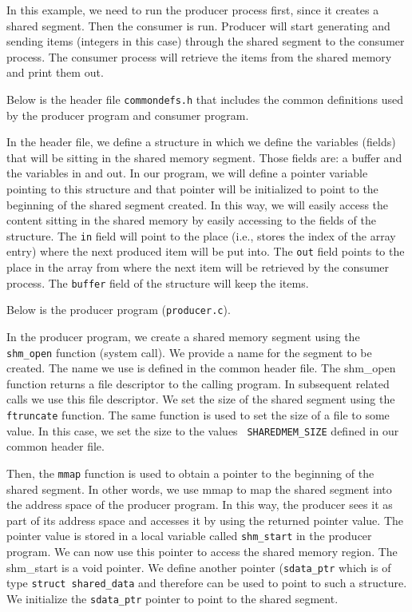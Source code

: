 In this example, we need to run the producer process first, since it
creates a shared segment. Then the consumer is run. Producer will
start generating and sending items (integers in this case) through the
shared segment to the consumer process. The consumer process will
retrieve the items from the shared memory and print them out.

Below is the header file {\tt commondefs.h} that includes the common
definitions used by the producer program and consumer program.


In the header file, we define a structure in which we define the
variables (fields) that will be sitting in the shared memory
segment. Those fields are: a buffer and the variables in and out. In
our program, we will define a pointer variable pointing to this
structure and that pointer will be initialized to point to the
beginning of the shared segment created. In this way, we will easily
access the content sitting in the shared memory by easily accessing to
the fields of the structure. The {\tt in} field will point to the
place (i.e., stores the index of the array entry) where the next
produced item will be put into. The {\tt out} field points to the
place in the array from where the next item will be retrieved by the
consumer process. The {\tt buffer} field of the structure will keep
the items.

Below is the producer program ({\tt producer.c}).


In the producer program, we create a shared memory segment using the
    {\tt shm\_open} function (system call). We provide a name for the
segment to be created. The name we use is defined in the common header
file. The shm\_open function returns a file descriptor to the calling
program. In subsequent related calls we use this file descriptor. We
set the size of the shared segment using the {\tt ftruncate}
function. The same function is used to set the size of a file to some
value. In this case, we set the size to the values {\tt
SHAREDMEM\_SIZE} defined in our common header file.

Then, the {\tt mmap} function is used to obtain a pointer to the
beginning of the shared segment. In other words, we use mmap to map
the shared segment into the address space of the producer program. In
this way, the producer sees it as part of its address space and
accesses it by using the returned pointer value. The pointer value is
stored in a local variable called {\tt shm\_start} in the producer
program. We can now use this pointer to access the shared memory
region. The shm\_start is a void pointer. We define another pointer
({\tt sdata\_ptr} which is of type {\tt struct shared\_data} and
therefore can be used to point to such a structure. We initialize the
    {\tt sdata\_ptr} pointer to point to the shared segment.

